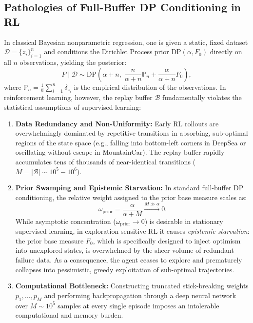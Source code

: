 \documentclass[10pt]{article}
\begin{document}
\subsection{Pathologies of Full-Buffer DP Conditioning in RL}
In classical Bayesian nonparametric regression, one is given a static, fixed dataset $\mathcal{D} = \{z_i\}_{i=1}^n$ and conditions the Dirichlet Process prior $\text{DP}(\alpha, F_0)$ directly on all $n$ observations, yielding the posterior:
\begin{equation}
P \mid \mathcal{D} \sim \text{DP}\left(\alpha + n, \; \frac{n}{\alpha + n} \mathbb{P}_n + \frac{\alpha}{\alpha + n} F_0\right),
\end{equation}
where $\mathbb{P}_n = \frac{1}{n} \sum_{i=1}^n \delta_{z_i}$ is the empirical distribution of the observations. In reinforcement learning, however, the replay buffer $\mathcal{B}$ fundamentally violates the statistical assumptions of supervised learning:
\begin{enumerate}
    \item \textbf{Data Redundancy and Non-Uniformity:} Early RL rollouts are overwhelmingly dominated by repetitive transitions in absorbing, sub-optimal regions of the state space (e.g., falling into bottom-left corners in DeepSea or oscillating without escape in MountainCar). The replay buffer rapidly accumulates tens of thousands of near-identical transitions ($M = |\mathcal{B}| \sim 10^5 - 10^6$).
    \item \textbf{Prior Swamping and Epistemic Starvation:} In standard full-buffer DP conditioning, the relative weight assigned to the prior base measure scales as:
    \begin{equation}
    \omega_{\text{prior}} = \frac{\alpha}{\alpha + M} \xrightarrow{M \gg \alpha} 0.
    \end{equation}
    While asymptotic concentration ($\omega_{\text{prior}} \to 0$) is desirable in stationary supervised learning, in exploration-sensitive RL it causes \textit{epistemic starvation}: the prior base measure $F_0$, which is specifically designed to inject optimism into unexplored states, is overwhelmed by the sheer volume of redundant failure data. As a consequence, the agent ceases to explore and prematurely collapses into pessimistic, greedy exploitation of sub-optimal trajectories.
    \item \textbf{Computational Bottleneck:} Constructing truncated stick-breaking weights $p_1, \dots, p_M$ and performing backpropagation through a deep neural network over $M \sim 10^5$ samples at every single episode imposes an intolerable computational and memory burden.
\end{enumerate}
\end{document}
